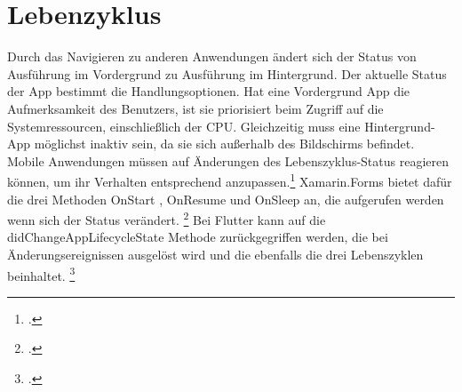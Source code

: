 \section{Lebenzyklus}
Durch das Navigieren zu anderen Anwendungen ändert sich der Status von Ausführung im Vordergrund zu Ausführung im Hintergrund.  Der aktuelle Status der App bestimmt die Handlungsoptionen.  Hat eine Vordergrund App die Aufmerksamkeit des Benutzers, ist sie priorisiert beim Zugriff auf die Systemressourcen, einschließlich der CPU.  Gleichzeitig muss eine Hintergrund-App möglichst inaktiv sein,  da sie sich außerhalb des Bildschirms befindet.  Mobile Anwendungen müssen auf Änderungen des Lebenszyklus-Status reagieren können, um ihr Verhalten entsprechend anzupassen.\footcite[Vgl.][Abgerufen am \today]{AppleLifecycycle2020} Xamarin.Forms bietet dafür die  drei Methoden \glq OnStart\grq{} , \glq OnResume\grq{} und \glq OnSleep\grq{} an,  die aufgerufen werden wenn sich der Status verändert. \footcite[Vgl.][Abgerufen am \today]{MicrosoftXamLifecycle2020} Bei Flutter kann auf die \glq didChangeAppLifecycleState\grq{} Methode zurückgegriffen werden, die bei Änderungsereignissen ausgelöst wird und die ebenfalls die drei Lebenszyklen beinhaltet. \footcite[Vgl.][Abgerufen am \today]{GoogleFlutterLifeCycle2020} 


